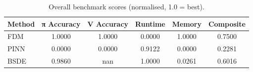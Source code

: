 \begin{table}[ht]
\centering
\caption{Overall benchmark scores (normalised, 1.0 = best).}
\label{tab:overall_score}
\begin{tabular}{lccccc}
\toprule
Method & π Accuracy & V Accuracy & Runtime & Memory & Composite \\
\midrule
FDM & 1.0000 & 1.0000 & 0.0000 & 1.0000 & 0.7500 \\
PINN & 0.0000 & 0.0000 & 0.9122 & 0.0000 & 0.2281 \\
BSDE & 0.9860 & nan & 1.0000 & 0.0261 & 0.6016 \\
\bottomrule
\end{tabular}
\end{table}